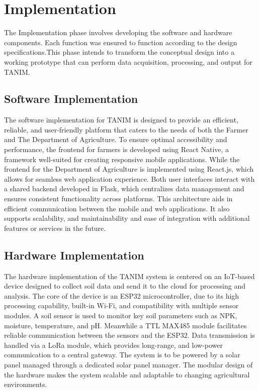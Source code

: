 {	\section{Implementation}
	The Implementation phase involves developing the software and hardware components. Each function was ensured to function according to the design specifications.This phase intends to transform the conceptual design into a working prototype that can perform data acquisition, processing, and output for TANIM.
	
	\subsection{Software Implementation}
	The software implementation for TANIM is designed to provide an efficient, reliable, and user-friendly platform that caters to the needs of both the Farmer and The Department of Agriculture. To ensure optimal accessibility and performance, the frontend for farmers is developed using React Native, a framework well-suited for creating responsive mobile applications. While the frontend for the Department of Agriculture is implemented using React.js, which allows for seamless web application experience. Both user interfaces interact with a shared backend developed in Flask, which centralizes data management and ensures consistent functionality across platforms. This architecture aids in efficient communication between the mobile and web applications. It also supports scalability, and maintainability and ease of integration with additional features or services in the future.
	
	\subsection{Hardware Implementation}
	The hardware implementation of the TANIM system is centered on an IoT-based device designed to collect soil data and send it to the cloud for processing and analysis. The core of the device is an ESP32 microcontroller, due to its high processing capability, built-in Wi-Fi, and compatibility with multiple sensor modules.  A soil sensor is used to monitor key soil parameters such as NPK, moisture, temperature, and pH. Meanwhile a TTL MAX485 module facilitates reliable communication between the sensors and the ESP32. Data transmission is handled via a LoRa module, which provides long-range, and low-power communication to a central gateway. The system is to be powered by a solar panel managed through a dedicated solar panel manager. The modular design of the hardware makes the system scalable and adaptable to changing agricultural environments.
	
}
